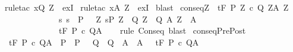 \begin{isabellebody}
\isamarkupfalse%
\ {\isacharparenleft}rule{\isacharunderscore}tac\ x{\isacharequal}{\isachardoublequoteopen}Q{\isacharprime}\ Z{\isachardoublequoteclose}\ \ exI{\isacharparenright}\isanewline
{}\isamarkupfalse%
\ {\isacharparenleft}rule{\isacharunderscore}tac\ x{\isacharequal}{\isachardoublequoteopen}A{\isacharprime}\ Z{\isachardoublequoteclose}\ \ exI{\isacharparenright}\isanewline
{}\isamarkupfalse%
\ blast\isanewline
{}\isamarkupfalse%
%
\endisatagproof
{\isafoldproof}%
%
\isadelimproof
\isanewline
%
\endisadelimproof
\isanewline
{}\isamarkupfalse%
\ conseq{\isacharcolon}{\isachardoublequoteopen}{\isasymlbrakk}{\isasymforall}Z{\isachardot}\ {\isasymGamma}{\isacharcomma}{\isasymTheta}\ {\isasymturnstile}\isactrlsub t\isactrlbsub {\isacharslash}F\isactrlesub \ {\isacharparenleft}P{\isacharprime}\ Z{\isacharparenright}\ c\ {\isacharparenleft}Q{\isacharprime}\ Z{\isacharparenright}{\isacharcomma}{\isacharparenleft}A{\isacharprime}\ Z{\isacharparenright}{\isacharsemicolon}\isanewline
\ \ \ \ \ \ \ \ \ \ \ \ \ \ {\isasymforall}s{\isachardot}\ s\ {\isasymin}\ P\ {\isasymlongrightarrow}\ {\isacharparenleft}{\isasymexists}\ Z{\isachardot}\ s{\isasymin}P{\isacharprime}\ Z\ {\isasymand}\ {\isacharparenleft}Q{\isacharprime}\ Z\ {\isasymsubseteq}\ Q{\isacharparenright}{\isasymand}\ {\isacharparenleft}A{\isacharprime}\ Z\ {\isasymsubseteq}\ A{\isacharparenright}{\isacharparenright}{\isasymrbrakk}\isanewline
\ \ \ \ \ \ \ \ \ \ \ \ \ \ {\isasymLongrightarrow}\isanewline
\ \ \ \ \ \ \ \ \ \ \ \ \ \ {\isasymGamma}{\isacharcomma}{\isasymTheta}{\isasymturnstile}\isactrlsub t\isactrlbsub {\isacharslash}F\isactrlesub \ P\ c\ Q{\isacharcomma}A{\isachardoublequoteclose}\isanewline
%
\isadelimproof
\ \ %
\endisadelimproof
%
\isatagproof
{}\isamarkupfalse%
\ {\isacharparenleft}rule\ Conseq{\isacharparenright}\ blast%
\endisatagproof
{\isafoldproof}%
%
\isadelimproof
\isanewline
%
\endisadelimproof
\isanewline
{}\isamarkupfalse%
\ conseqPrePost{\isacharcolon}\ \isanewline
\ \ {\isachardoublequoteopen}{\isasymGamma}{\isacharcomma}{\isasymTheta}{\isasymturnstile}\isactrlsub t\isactrlbsub {\isacharslash}F\isactrlesub \ P{\isacharprime}\ c\ Q{\isacharprime}{\isacharcomma}A{\isacharprime}\ {\isasymLongrightarrow}\ P\ {\isasymsubseteq}\ P{\isacharprime}\ {\isasymLongrightarrow}\ \ Q{\isacharprime}\ {\isasymsubseteq}\ Q\ {\isasymLongrightarrow}\ A{\isacharprime}\ {\isasymsubseteq}\ A\ {\isasymLongrightarrow}\ \ {\isasymGamma}{\isacharcomma}{\isasymTheta}{\isasymturnstile}\isactrlsub t\isactrlbsub {\isacharslash}F\isactrlesub \ P\ c\ Q{\isacharcomma}A{\isachardoublequoteclose}\isanewline

\end{isabellebody}
